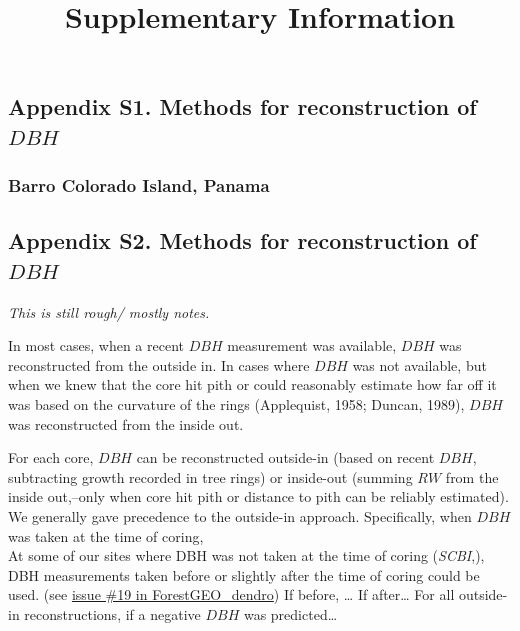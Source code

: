 \documentclass[
]{article}
\title{Supplementary Information}
\author{}
\date{\vspace{-2.5em}}
\begin{document}
\maketitle

{
\setcounter{tocdepth}{3}
\tableofcontents
}
\newpage

\hypertarget{appendix-s1.-methods-for-reconstruction-of-dbh}{%
\subsection{\texorpdfstring{Appendix S1. Methods for reconstruction of
\(DBH\)}{Appendix S1. Methods for reconstruction of DBH}}\label{appendix-s1.-methods-for-reconstruction-of-dbh}}

\hypertarget{barro-colorado-island-panama}{%
\subsubsection{Barro Colorado Island,
Panama}\label{barro-colorado-island-panama}}

\newpage

\hypertarget{appendix-s2.-methods-for-reconstruction-of-dbh}{%
\subsection{\texorpdfstring{Appendix S2. Methods for reconstruction of
\(DBH\)}{Appendix S2. Methods for reconstruction of DBH}}\label{appendix-s2.-methods-for-reconstruction-of-dbh}}

\emph{This is still rough/ mostly notes.}

In most cases, when a recent \(DBH\) measurement was available, \(DBH\)
was reconstructed from the outside in. In cases where \(DBH\) was not
available, but when we knew that the core hit pith or could reasonably
estimate how far off it was based on the curvature of the rings
(Applequist, 1958; Duncan, 1989), \(DBH\) was reconstructed from the
inside out.

For each core, \(DBH\) can be reconstructed outside-in (based on recent
\(DBH\), subtracting growth recorded in tree rings) or inside-out
(summing \(RW\) from the inside out,--only when core hit pith or
distance to pith can be reliably estimated). We generally gave
precedence to the outside-in approach. Specifically, when \(DBH\) was
taken at the time of coring,\\
At some of our sites where DBH was not taken at the time of coring
(\emph{SCBI},), DBH measurements taken before or slightly after the time
of coring could be used. (see
\href{https://github.com/EcoClimLab/ForestGEO_dendro/issues/19}{issue
\#19 in ForestGEO\_dendro}) If before, \ldots{} If after\ldots{} For all
outside-in reconstructions, if a negative \(DBH\) was predicted\ldots{}
\end{document}
